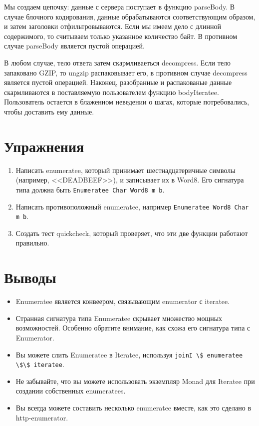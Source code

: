 Мы создаем цепочку: данные с сервера поступает в функцию parseBody. В случае блочного кодирования, данные обрабатываются соответствующим образом, и затем заголовки отфильтровываются. Если мы имеем дело с длинной содержимого, то считываем только указанное количество байт. В противном случае parseBody является пустой операцией.

В любом случае, тело ответа затем скармливаеться decompress. Если тело запаковано GZIP, то ungzip распаковывает его, в противном случае decompress является пустой операцией. Наконец, разобранные и распакованые данные скармливаются в поставляемую пользователем функцию bodyIteratee. Пользователь остается в блаженном неведении о шагах, которые потребовались, чтобы доставить ему данные.

\section{Упражнения}

\begin{enumerate}
\item Написать enumeratee, который принимает шестнадцатеричные символы (например, <<DEADBEEF>>), и записывает их в Word8. Его сигнатура типа должна быть \lstinline'Enumeratee Char Word8 m b'.
\item Написать противоположный enumeratee, например \lstinline'Enumeratee Word8 Char m b'.
\item Создать тест quickcheck, который проверяет, что эти две функции работают правильно.
\end{enumerate}

\section{Выводы}

\begin{itemize}
\item Enumeratee является конвеером, связывающим enumerator с iteratee.
\item Странная сигнатура типа Enumeratee скрывает множество мощных возможностей. Особенно обратите внимание, как схожа его сигнатура типа с Enumerator.
\item Вы можете слить Enumeratee в Iteratee, используя \lstinline'joinI \$ enumeratee \$\$ iteratee'.
\item Не забывайте, что вы можете использовать экземпляр Monad для Iteratee при создании собственных enumeratees.
\item Вы всегда можете составить несколько enumeratee вместе, как это сделано в http-enumerator.
\end{itemize}
